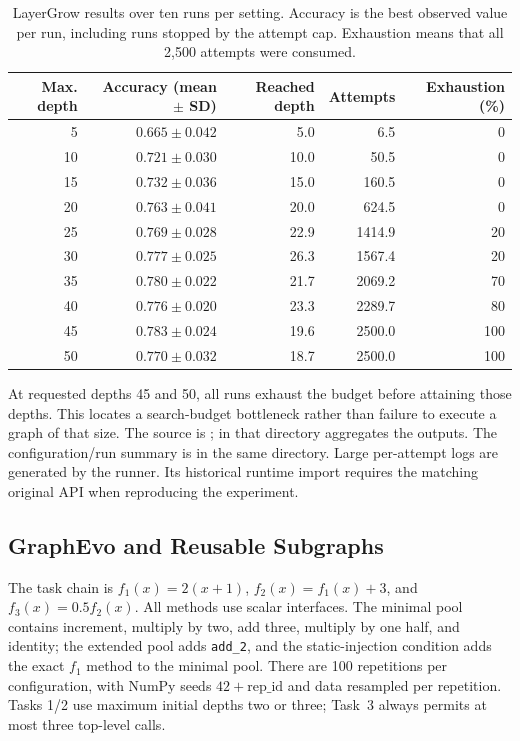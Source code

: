 \begin{table}[tb]
\centering\small
\caption{LayerGrow results over ten runs per setting. Accuracy is the best
observed value per run, including runs stopped by the attempt cap. Exhaustion
means that all 2,500 attempts were consumed.}
\label{tab:convergence_stats_appendix}
\begin{tabular}{rrrrr}
\toprule
Max. depth & Accuracy (mean $\pm$ SD) & Reached depth & Attempts & Exhaustion (\%) \\
\midrule
5  & $0.665\pm0.042$ & 5.0  & 6.5    & 0 \\
10 & $0.721\pm0.030$ & 10.0 & 50.5   & 0 \\
15 & $0.732\pm0.036$ & 15.0 & 160.5  & 0 \\
20 & $0.763\pm0.041$ & 20.0 & 624.5  & 0 \\
25 & $0.769\pm0.028$ & 22.9 & 1414.9 & 20 \\
30 & $0.777\pm0.025$ & 26.3 & 1567.4 & 20 \\
35 & $0.780\pm0.022$ & 21.7 & 2069.2 & 70 \\
40 & $0.776\pm0.020$ & 23.3 & 2289.7 & 80 \\
45 & $0.783\pm0.024$ & 19.6 & 2500.0 & 100 \\
50 & $0.770\pm0.032$ & 18.7 & 2500.0 & 100 \\
\bottomrule
\end{tabular}
\end{table}

At requested depths 45 and 50, all runs exhaust the budget before attaining
those depths. This locates a search-budget bottleneck rather than failure to
execute a graph of that size. The source is
;
 in that directory aggregates the outputs. The configuration/run summary is
 in the same directory. Large per-attempt
logs are generated by the runner. Its historical runtime import requires the
matching original API when reproducing the experiment.

\subsection{GraphEvo and Reusable Subgraphs}
\label{sec:appendix_exp2}
The task chain is $f_1(x)=2(x+1)$, $f_2(x)=f_1(x)+3$, and
$f_3(x)=0.5f_2(x)$. All methods use scalar interfaces. The minimal pool contains
increment, multiply by two, add three, multiply by one half, and identity;
the extended pool adds \texttt{add\_2}, and the static-injection condition adds
the exact $f_1$ method to the minimal pool. There are 100 repetitions per
configuration, with NumPy seeds $42+\mathrm{rep\_id}$ and data resampled per repetition.
Tasks 1/2 use maximum initial depths two or three; Task~3 always permits at most three top-level calls.

